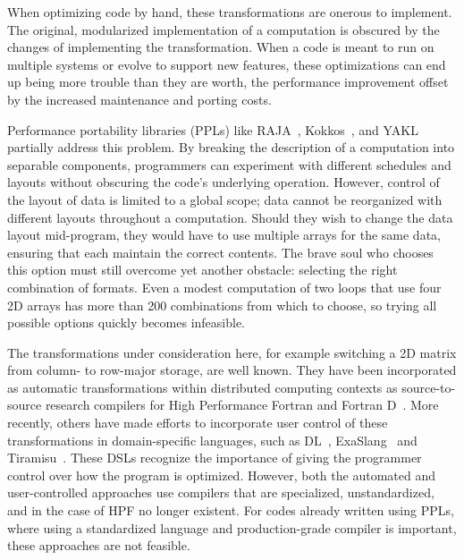 When optimizing code by hand, these transformations are onerous to implement.
The original, modularized implementation of a computation is obscured by the changes of implementing the transformation. 
When a code is meant to run on multiple systems or evolve to support new features, these optimizations can end up being more trouble than they are worth, the performance improvement offset by the increased maintenance and porting costs.

Performance portability libraries (PPLs) like RAJA~\cite{hornung2014RAJA}, Kokkos~\cite{edwards2014kokkos}, and YAKL~\cite{norman2022portable} partially address this problem.
By breaking the description of a computation into separable components, programmers can experiment with different schedules and layouts without obscuring the code's underlying operation.
However, control of the layout of data is limited to a global scope; data cannot be reorganized with different layouts throughout a computation.
Should they wish to change the data layout mid-program, they would have to use multiple arrays for the same data, ensuring that each maintain the correct contents.
The brave soul who chooses this option must still overcome yet another obstacle: selecting the right combination of formats.
Even a modest computation of two loops that use four 2D arrays has more than 200 combinations from which to choose, so trying all possible options quickly becomes infeasible. 

The transformations under consideration here, for example switching a 2D matrix from column- to row-major storage, are well known.
They have been incorporated as automatic transformations within distributed computing contexts as source-to-source research compilers for High Performance Fortran and Fortran D~\cite{bixby1994automatic,kennedy1995automatic,kennedy1998automatic}.
More recently, others have made efforts to incorporate user control of these transformations in domain-specific languages, such as DL~\cite{sung2012dl}, ExaSlang~\cite{kronawitter2018automatic} and Tiramisu~\cite{baghdadi2019tiramisu}.
These DSLs recognize the importance of giving the programmer control over how the program is optimized. %
However, both the automated and user-controlled approaches use compilers that are specialized, unstandardized, and in the case of HPF no longer existent.
For codes already written using PPLs, where using a standardized language and production-grade compiler is important, these approaches are not feasible.

